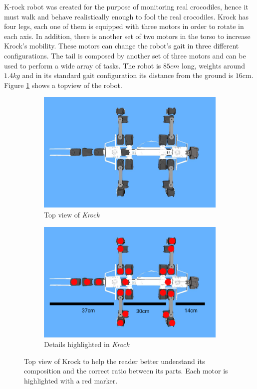 \documentclass[../document.tex]{subfiles}
\begin{document}
    K-rock robot was created for the purpose of monitoring real crocodiles, hence it must walk and behave realistically enough to fool the real crocodiles. Krock has four legs, each one of them is equipped with three motors in order to rotate in each axis. In addition, there is another set of two motors in the torso to increase Krock's mobility. These motors can change the robot's gait in three different configurations.
The tail is composed by another set of three motors and can be used to perform a wide array of tasks.
The robot is $85cm$ long, weights around $1.4kg$ and in its standard gait configuration its distance from the ground is $16$cm. Figure \ref{fig : krock-top} shows a topview of the robot.
\begin{figure}[htbp]
\centering
     \begin{subfigure}[b]{0.49\textwidth}
    \includegraphics[width=\textwidth]{../img/krock-top.jpg}
    \caption{Top view of \emph{Krock}}
       \end{subfigure}
     \begin{subfigure}[b]{0.49\textwidth}
      \includegraphics[width=\textwidth]{../img/krock-top-highlight.png}
    \caption{Details highlighted in \emph{Krock}}
       \end{subfigure}
       \caption{Top view of Krock to help the reader better understand its composition and the correct ratio between its parts.  Each motor is highlighted with a red marker.}
       \label{fig : krock-top}

\end{figure}
\end{document}
